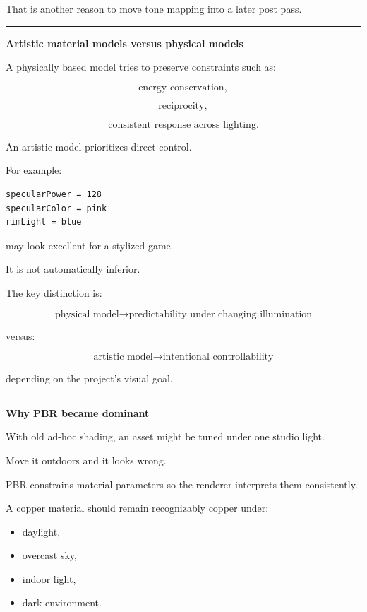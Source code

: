 That is another reason to move tone mapping into a later post pass.

\begin{center}\rule{0.5\linewidth}{0.5pt}\end{center}

\textbf{Artistic material models versus physical models}

A physically based model tries to preserve constraints such as:

\[
\text{energy conservation},
\]

\[
\text{reciprocity},
\]

\[
\text{consistent response across lighting}.
\]

An artistic model prioritizes direct control.

For example:

\begin{verbatim}
specularPower = 128
specularColor = pink
rimLight = blue
\end{verbatim}

may look excellent for a stylized game.

It is not automatically inferior.

The key distinction is:

\[
\boxed{
\text{physical model}
\rightarrow
\text{predictability under changing illumination}
}
\]

versus:

\[
\boxed{
\text{artistic model}
\rightarrow
\text{intentional controllability}
}
\]

depending on the project's visual goal.

\begin{center}\rule{0.5\linewidth}{0.5pt}\end{center}

\textbf{Why PBR became dominant}

With old ad-hoc shading, an asset might be tuned under one studio light.

Move it outdoors and it looks wrong.

PBR constrains material parameters so the renderer interprets them consistently.

A copper material should remain recognizably copper under:

\begin{itemize}
\tightlist
\item
  daylight,
\item
  overcast sky,
\item
  indoor light,
\item
  dark environment.
\end{itemize}

